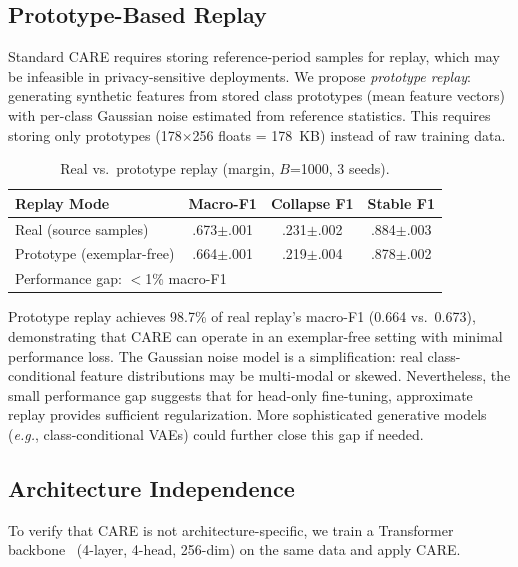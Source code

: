 \documentclass[journal]{IEEEtran}
\newcommand{\ours}{CARE}  %
\newcommand{\eg}{\textit{e.g.}}
\begin{document}
\subsection{Prototype-Based Replay}
\label{sec:proto_replay}

Standard \ours{} requires storing reference-period samples for replay, which may be infeasible in privacy-sensitive deployments. We propose \textit{prototype replay}: generating synthetic features from stored class prototypes (mean feature vectors) with per-class Gaussian noise estimated from reference statistics. This requires storing only prototypes (178$\times$256 floats = 178~KB) instead of raw training data.

\begin{table}[t]
\centering
\caption{Real vs.\ prototype replay (margin, $B$=1000, 3 seeds).}
\label{tab:proto_replay}
\small
\begin{tabular}{@{}l ccc@{}}
\toprule
Replay Mode & Macro-F1 & Collapse F1 & Stable F1 \\
\midrule
Real (source samples) & .673$\pm$.001 & .231$\pm$.002 & .884$\pm$.003 \\
Prototype (exemplar-free) & .664$\pm$.001 & .219$\pm$.004 & .878$\pm$.002 \\
\midrule
\multicolumn{4}{l}{Performance gap: $<$1\% macro-F1} \\
\bottomrule
\end{tabular}
\end{table}

Prototype replay achieves 98.7\% of real replay's macro-F1 (0.664 vs.\ 0.673), demonstrating that \ours{} can operate in an exemplar-free setting with minimal performance loss.
The Gaussian noise model is a simplification: real class-conditional feature distributions may be multi-modal or skewed. Nevertheless, the small performance gap suggests that for head-only fine-tuning, approximate replay provides sufficient regularization. More sophisticated generative models (\eg{}, class-conditional VAEs) could further close this gap if needed.

\subsection{Architecture Independence}

To verify that \ours{} is not architecture-specific, we train a Transformer backbone~\cite{vaswani2017attention} (4-layer, 4-head, 256-dim) on the same data and apply CARE.
\end{document}
